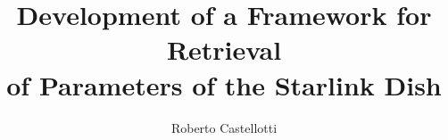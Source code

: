 \usepackage[utf8]{inputenc}
\usepackage{packages}
\usepackage{beamermods}

\author[Roberto Castellotti]{Roberto Castellotti}
\title[IDP]{Development of a Framework for Retrieval \\ of Parameters of the Starlink Dish}
\usepackage{pgfpages}
\usepackage{ifthen}
\newif\ifsolution%

\makeatletter
\let\@@magyar@captionfix\relax
\makeatother
